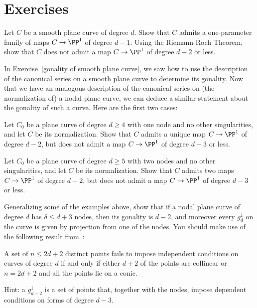 \section{Exercises}

\begin{exercise}\label{gonality of smooth plane curve}
Let $C$ be a smooth plane curve of degree $d$. Show that $C$ admits a one-parameter family of maps $C \to \PP^1$ of degree $d-1$. Using the Riemann-Roch Theorem, show that $C$ does not admit a map $C \to \PP^1$ of degree $d-2$ or less.
\end{exercise}

In Exercise~\ref{gonality of smooth plane curve}, we saw how to use the description of the canonical series on a smooth plane curve to determine its gonality. Now that we have an analogous description of the canonical series on (the normalization of) a nodal plane curve, we can deduce a similar statement about the gonality of such a curve. Here are the first two cases: 

\begin{exercise}
Let $C_0$ be a plane curve of degree $d\geq 4$ with one node and no other singularities, and let $C$ be its normalization. Show that $C$ admits a unique map $C \to \PP^1$ of degree $d-2$, but does not admit a map $C \to \PP^1$ of degree $d-3$ or less.
\end{exercise}

\begin{exercise}
Let $C_0$ be a plane curve of degree $d\geq 5$ with two nodes and no other singularities, and let $C$ be its normalization. Show that $C$ admits two maps $C \to \PP^1$ of degree $d-2$, but does not admit a map $C \to \PP^1$ of degree $d-3$ or less.
\end{exercise}

\begin{exercise}
Generalizing some of the examples above, show that if a nodal plane curve of degree $d$ has $\delta\leq d+3$ nodes,
then its gonality is $d-2$, and moreover every $g^1_d$ on the curve is given by projection from one of the nodes.
You should make use of the following result from~\cite[p. 302]{MR1376653}:
\begin{proposition}
 A set of $n \leq 2d+ 2$ distinct
points fails to impose independent conditions on curves of degree
$d$ if and only if either $d + 2$ of the points  are collinear or $n = 2d + 2$ and all the points lie
on a conic.
\end{proposition} 
Hint: a $g^1_{d-2}$ is a set of points that, together with the nodes, impose dependent conditions on forms of degree $d-3$.
\end{exercise}

